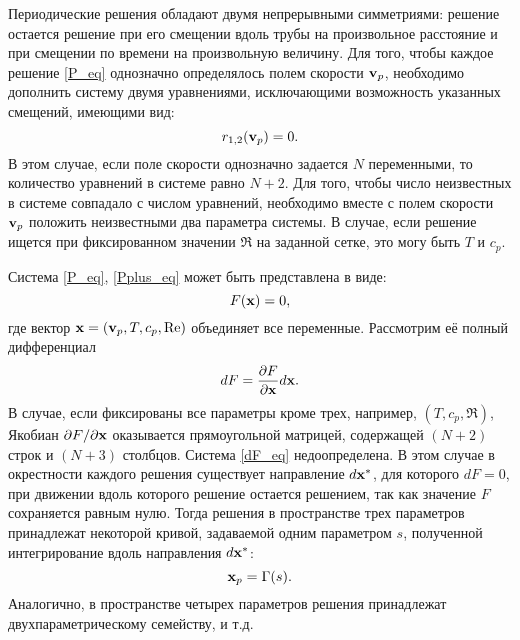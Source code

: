 Периодические решения обладают двумя непрерывными симметриями: решение остается решение при его смещении вдоль трубы на произвольное расстояние и при смещении по времени на произвольную величину. Для того, чтобы каждое решение \eqref{P_eq} однозначно определялось полем скорости $\mathbf{v}_p$, необходимо дополнить систему двумя уравнениями, исключающими возможность указанных смещений, имеющими вид:
\begin{equation}\label{Pplus_eq}
r_{1,2}(\mathbf{v}_p) = 0.
\end{equation}
В этом случае, если поле скорости однозначно задается $N$ переменными, то количество уравнений в системе равно $N+2$. Для того, чтобы число неизвестных в системе совпадало с числом уравнений, необходимо вместе с полем скорости $\mathbf{v}_p$ положить неизвестными два параметра системы. В случае, если решение ищется при фиксированном значении $\Re$ на заданной сетке, это могу быть $T$ и $c_p$.

Система \eqref{P_eq}, \eqref{Pplus_eq} может быть представлена в виде:
\begin{equation}\label{F_eq}
F(\mathbf{x}) = 0, 
\end{equation}
где вектор $\mathbf{x} = (\mathbf{v}_p, T, c_p, \operatorname{Re})$ объединяет все переменные. Рассмотрим её полный дифференциал
\begin{equation}\label{dF_eq}
dF = \frac{\partial F}{\partial \mathbf{x}}d\mathbf{x}.
\end{equation}
В случае, если фиксированы все параметры кроме трех, например, $(T, c_p, \Re)$, Якобиан ${\partial F}/{\partial \mathbf{x}}$ оказывается прямоугольной матрицей, содержащей $(N+2)$ строк и $(N+3)$ столбцов. Система \eqref{dF_eq} недоопределена. В этом случае в окрестности каждого решения существует направление $d\mathbf{x}^*$, для которого $dF = 0$, при движении вдоль которого решение остается решением, так как значение $F$ сохраняется равным нулю. Тогда решения в пространстве трех параметров принадлежат некоторой кривой, задаваемой одним параметром $s$, полученной интегрирование вдоль направления $d\mathbf{x}^*$:
$$
\mathbf{x}_p = \Gamma(s).
$$ 
Аналогично, в пространстве четырех параметров решения принадлежат двухпараметрическому семейству, и т.д. 

